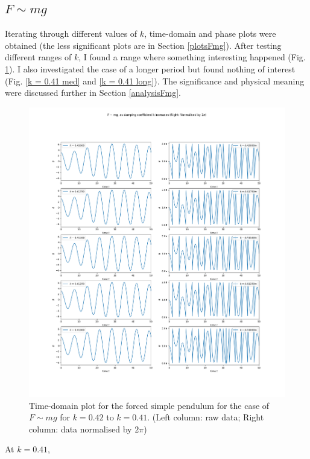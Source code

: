 \documentclass[10pt, twocolumn]{article}
\begin{document}
\subsection{$F \sim{mg}$}
Iterating through different values of $k$, time-domain and phase plots were obtained (the less significant plots are in Section \ref{plotsFmg}). After testing different ranges of $k$, I found a range where something interesting happened (Fig. \ref{k 5 to 1 short}). I also investigated the case of a longer period but found nothing of interest (Fig. \ref{k = 0.41 med} and \ref{k = 0.41 long}). The significance and physical meaning were discussed further in Section \ref{analysisFmg}.
\onecolumn
\begin{figure}
    \centering
    \includegraphics[width= \columnwidth]{Projects/ForcedSimplePendulum/Plots/F~mg as damping coefficient k increases from 0.42 to 0.41.png}
    \caption{Time-domain plot for the forced simple pendulum for the case of $F \sim{mg}$ for $k = 0.42$ to $k = 0.41$. (Left column: raw data; Right column: data normalised by $2\pi$)}
    \label{k 5 to 1 short}
\end{figure}
\twocolumn
At $k = 0.41$,
\end{document}
